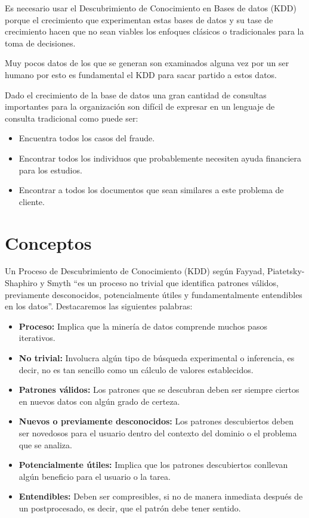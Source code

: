 \documentclass[12pt, twoside, openright]{report} %
\begin{document}
Es necesario usar el Descubrimiento de Conocimiento en Bases de datos (KDD) porque el crecimiento que experimentan estas bases de datos y su tase de crecimiento hacen que no sean viables los enfoques clásicos o tradicionales para la toma de decisiones.

Muy pocos datos de los que se generan son examinados alguna vez por un ser humano por esto es fundamental el KDD para sacar partido a estos datos.

Dado el crecimiento de la base de datos una gran cantidad de consultas importantes para la organización son difícil de expresar en un lenguaje de consulta tradicional como puede ser:
\begin{itemize}
	\item Encuentra todos los casos del fraude.
	\item Encontrar todos los individuos que probablemente necesiten ayuda financiera para los estudios.
	\item Encontrar a todos los documentos que sean similares a este problema de cliente.
\end{itemize}

\section{Conceptos}
Un Proceso de Descubrimiento de Conocimiento (KDD) según Fayyad, Piatetsky-Shaphiro y Smyth “es un proceso no trivial que identifica patrones válidos, previamente desconocidos, potencialmente útiles y fundamentalmente entendibles en los datos”. Destacaremos las siguientes palabras:
\begin{itemize}
	\item \textbf{Proceso:} Implica que la minería de datos comprende muchos pasos iterativos.
	\item \textbf{No trivial:} Involucra algún tipo de búsqueda experimental o inferencia, es decir, no es tan sencillo como un cálculo de valores establecidos.
	\item \textbf{Patrones válidos:} Los patrones que se descubran deben ser siempre ciertos en nuevos datos con algún grado de certeza.
	\item \textbf{Nuevos o previamente desconocidos:} Los patrones descubiertos deben ser novedosos para el usuario dentro del contexto del dominio o el problema que se analiza.
	\item \textbf{Potencialmente útiles:} Implica que los patrones descubiertos conllevan algún beneficio para el usuario o la tarea.
	\item \textbf{Entendibles:} Deben ser compresibles, si no de manera inmediata después de un postprocesado, es decir, que el patrón debe tener sentido.
\end{itemize}
\end{document}
